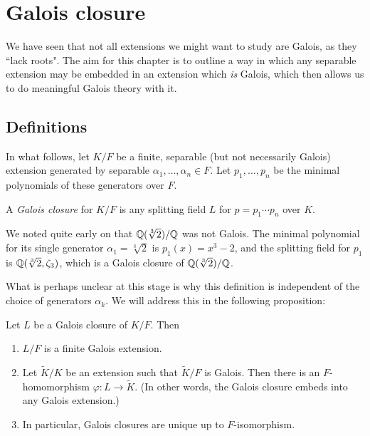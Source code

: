 \chapter{Galois closure}

We have seen that not all extensions we might want to study are Galois, as they ``lack roots". The aim for this chapter is to outline a way in which any separable extension may be embedded in an extension which \emph{is} Galois, which then allows us to do meaningful Galois theory with it.

\section{Definitions}

In what follows, let $K/F$ be a finite, separable (but not necessarily Galois) extension generated by separable $\alpha_1, \ldots, \alpha_n \in F$. Let $p_1, \ldots, p_n$ be the minimal polynomials of these generators over $F$.

\begin{definition}
    A \emph{Galois closure} for $K/F$ is any splitting field $L$ for $p = p_1 \cdots p_n$ over $K$.
\end{definition}

\begin{example}
    We noted quite early on that $\mathbb{{Q}}(\sqrt[3]{2})/\mathbb{{Q}}$ was not Galois. The minimal polynomial for its single generator $\alpha_1 = \sqrt[3]{2}$ is $p_1(x) = x^3 - 2$, and the splitting field for $p_1$ is $\mathbb{{Q}}(\sqrt[3]{2}, \zeta_3)$, which is a Galois closure of $\mathbb{{Q}}(\sqrt[3]{2})/\mathbb{{Q}}$.
\end{example}

What is perhaps unclear at this stage is why this definition is independent of the choice of generators $\alpha_k$. We will address this in the following proposition:

\begin{proposition}
    Let $L$ be a Galois closure of $K/F$. Then
    \begin{enumerate}[label=(\alph*)]
        \item $L/F$ is a finite Galois extension.
        \item Let $\widetilde{K}/K$ be an extension such that $\widetilde{K}/F$ is Galois. Then there is an $F$-homomorphism $\varphi: L \to \widetilde{K}$. (In other words, the Galois closure embeds into any Galois extension.)
        \item In particular, Galois closures are unique up to $F$-isomorphism.
    \end{enumerate}
\end{proposition}

